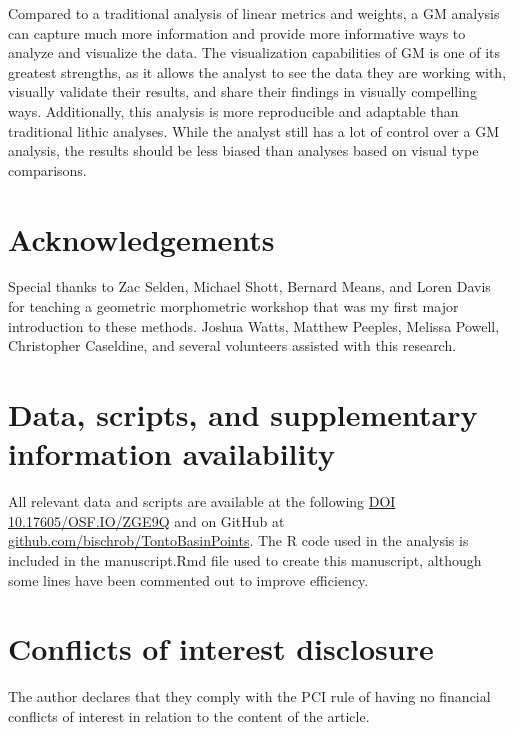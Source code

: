\documentclass[a4paper]{article}
\begin{document}
Compared to a traditional analysis of linear metrics and weights, a GM analysis can capture much more information and provide more informative ways to analyze and visualize the data. The visualization capabilities of GM is one of its greatest strengths, as it allows the analyst to see the data they are working with, visually validate their results, and share their findings in visually compelling ways. Additionally, this analysis is more reproducible and adaptable than traditional lithic analyses. While the analyst still has a lot of control over a GM analysis, the results should be less biased than analyses based on visual type comparisons.

\hypertarget{acknowledgements}{%
\section*{Acknowledgements}\label{acknowledgements}}

Special thanks to Zac Selden, Michael Shott, Bernard Means, and Loren Davis for teaching a geometric morphometric workshop that was my first major introduction to these methods. Joshua Watts, Matthew Peeples, Melissa Powell, Christopher Caseldine, and several volunteers assisted with this research.

\hypertarget{data-scripts-and-supplementary-information-availability}{%
\section*{Data, scripts, and supplementary information availability}\label{data-scripts-and-supplementary-information-availability}}

All relevant data and scripts are available at the following \href{https://osf.io/zge9q/}{DOI 10.17605/OSF.IO/ZGE9Q} and on GitHub at \href{https://github.com/bischrob/TontoBasinPoints}{github.com/bischrob/TontoBasinPoints}. The R code used in the analysis is included in the manuscript.Rmd file used to create this manuscript, although some lines have been commented out to improve efficiency.

\hypertarget{conflicts-of-interest-disclosure}{%
\section*{Conflicts of interest disclosure}\label{conflicts-of-interest-disclosure}}

The author declares that they comply with the PCI rule of having no financial conflicts of interest in relation to the content of the article.

\nocite{Oliver1997-lk}

\printbibliography[notcategory=ignore]              %
\end{document}
